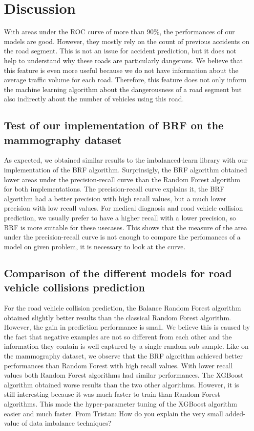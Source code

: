 \documentclass[conference]{IEEEtran}
\newcommand{\TG}[1]{\colorlet{saved}{.}\color{orange}From Tristan: #1\color{saved}}
\begin{document}
\section{Discussion}
\label{sec:discussion}

With areas under the ROC curve of more than $90\%$, the performances of our models are good.
However, they mostly rely on the count of previous accidents on the road segment. 
This is not an issue for accident prediction, but it does not help to 
understand why these roads are particularly dangerous. We believe that
this feature is even more useful because we do not have information
about the average traffic volume for each road. Therefore, this feature does
not only inform the machine learning algorithm about the dangerousness of a road
segment but also indirectly about the number of vehicles using this road.

\subsection{Test of our implementation of BRF on the mammography dataset}
As expected, we obtained similar results to the imbalanced-learn library with our implementation of the BRF algorithm. Surprinsigly, the BRF algorithm obtained lower areas under the precision-recall curve than the Random Forest algorithm for both implementations. The precision-recall curve explains it, the BRF algorithm had a better precision with high recall values, but a much lower precision with low recall values. For medical diagnosis and road vehicle collision prediction, we usually prefer to have a higher recall with a lower precision, so BRF is more suitable for these usecases. This shows that the measure of the area under the precision-recall curve is not enough to compare the perfomances of a model on given problem, it is necessary to look at the curve. 

\subsection{Comparison of the different models for road vehicle collisions prediction}
For the road vehicle collision prediction, the Balance Random Forest algorithm obtained slightly better results than the classical Random Forest algorithm. However, the gain in prediction performance is small. We believe this is caused by the fact that negative examples are not so different from each other and the information they contain is well captured by a single random sub-sample. Like on the mammography dataset, we observe that the BRF algorithm achieved better performances than Random Forest with high recall values. With lower recall values both Random Forest algorithms had similar performances. The XGBoost algorithm obtained worse results than the two other algorithms. However, it is still interesting because it was much faster to train than Random Forest algorithms. This made the hyper-parameter tuning of the XGBoost algorithm easier and much faster.
\TG{How do you explain the very small added-value of data imbalance techniques?} 
\end{document}
